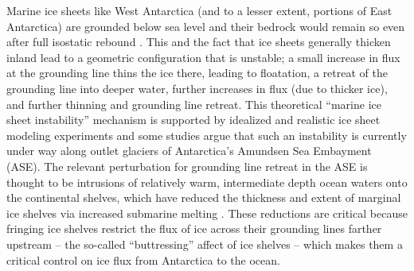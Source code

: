 \documentclass[review,oneside]{igs}
\begin{document}
Marine ice sheets like West Antarctica (and to a lesser extent, portions of East Antarctica) are grounded below sea level and their bedrock would remain so even after full isostatic rebound \citep{barletta2018}. This and the fact that ice sheets generally thicken inland lead to a geometric configuration that is unstable; a small increase in flux at the grounding line thins the ice there, leading to floatation, a retreat of the grounding line into deeper water, further increases in flux (due to thicker ice), and further thinning and grounding line retreat. This theoretical ``marine ice sheet instability'' mechanism \citep{mercer1978, schoof2007} is supported by idealized \citep{schoof2012, asay2016} and realistic ice sheet modeling \citep{royston2016} experiments and some studies \citep{joughin2014,rignot2014} argue that such an instability is currently under way along outlet glaciers of Antarctica's Amundsen Sea Embayment (ASE). The relevant perturbation for grounding line retreat in the ASE is thought to be intrusions of relatively warm, intermediate depth ocean waters onto the continental shelves, which have reduced the thickness and extent of marginal ice shelves via increased submarine melting \citep[e.g.,][]{JenkinsEtAl2016}. These reductions are critical because fringing ice shelves restrict the flux of ice across their grounding lines farther upstream -- the so-called ``buttressing'' affect of ice shelves \citep{gudmundsson2012, gudmundsson2013, derydt2015} -- which makes them a critical control on ice flux from Antarctica to the ocean.

\end{document}
